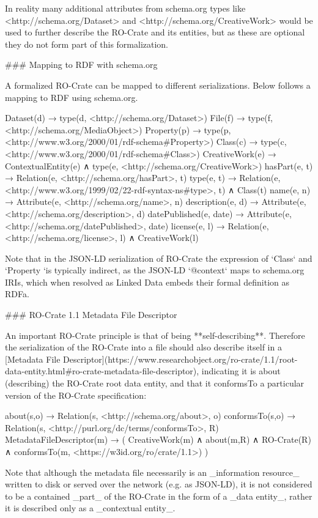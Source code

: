 In reality many additional attributes from schema.org types like <http://schema.org/Dataset> and <http://schema.org/CreativeWork> would be used to further describe the RO-Crate and its entities, but as these are optional they do not form part of this formalization.


### Mapping to RDF with schema.org

A formalized RO-Crate can be mapped to different serializations. Below follows a mapping to RDF using schema.org.

    Dataset(d) →  type(d, <http://schema.org/Dataset>)
    File(f) →  type(f, <http://schema.org/MediaObject>)
    Property(p) →  type(p, <http://www.w3.org/2000/01/rdf-schema#Property>)
    Class(c) →  type(c, <http://www.w3.org/2000/01/rdf-schema#Class>)
    CreativeWork(e) →  ContextualEntity(e) ∧ type(e, <http://schema.org/CreativeWork>)
    hasPart(e, t) →  Relation(e, <http://schema.org/hasPart>, t)
    type(e, t) →  Relation(e, <http://www.w3.org/1999/02/22-rdf-syntax-ns#type>, t) ∧ Class(t)
    name(e, n) →  Attribute(e, <http://schema.org/name>, n)
    description(e, d) →  Attribute(e, <http://schema.org/description>, d)
    datePublished(e, date) →  Attribute(e, <http://schema.org/datePublished>, date)
    license(e, l) →  Relation(e, <http://schema.org/license>, l) ∧ CreativeWork(l)

Note that in the JSON-LD serialization of RO-Crate the expression of `Class` and `Property `is typically indirect, as the JSON-LD `@context` maps to schema.org IRIs, which when resolved as Linked Data embeds their formal definition as RDFa. 


### RO-Crate 1.1 Metadata File Descriptor

An important RO-Crate principle is that of being **self-describing**. Therefore the serialization of the RO-Crate into a file should also describe itself in a [Metadata File Descriptor](https://www.researchobject.org/ro-crate/1.1/root-data-entity.html#ro-crate-metadata-file-descriptor), indicating it is about (describing) the RO-Crate root data entity, and that it conformsTo a particular version of the RO-Crate specification:

    about(s,o) →  Relation(s, <http://schema.org/about>, o)
    conformsTo(s,o) →  Relation(s, <http://purl.org/dc/terms/conformsTo>, R)
    MetadataFileDescriptor(m) →  ( CreativeWork(m) ∧ about(m,R) ∧ RO-Crate(R) ∧ 
        conformsTo(m, <https://w3id.org/ro/crate/1.1>) )

Note that although the metadata file necessarily is an _information resource_ written to disk or served over the network (e.g. as JSON-LD), it is not considered to be a contained _part_ of the RO-Crate in the form of a _data entity_, rather it is described only as a _contextual entity_.

